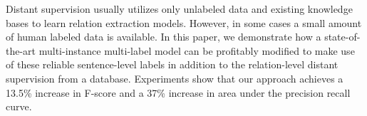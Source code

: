 Distant supervision usually utilizes only unlabeled data and existing knowledge bases to learn relation extraction models. However, in some cases a small amount of human labeled data is available. In this paper, we demonstrate how a state-of-the-art multi-instance multi-label model can be profitably modified to make use of these reliable sentence-level labels in addition to the relation-level distant supervision from a database. Experiments show that our approach achieves a 13.5\% increase in F-score and a 37\% increase in area under the precision recall curve.
